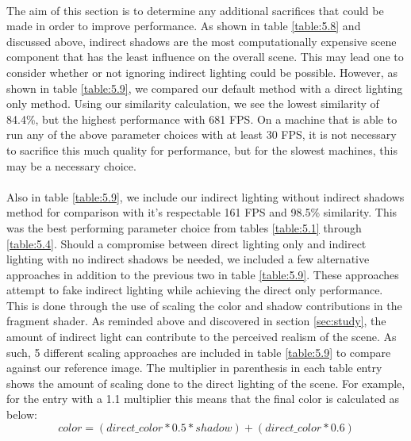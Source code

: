 \paragraph{}
The aim of this section is to determine any additional sacrifices that could be made in order to improve performance.  As shown in table \ref{table:5.8} and discussed above, indirect shadows are the most computationally expensive scene component that has the least influence on the overall scene.  This may lead one to consider whether or not ignoring indirect lighting could be possible.  However, as shown in table \ref{table:5.9}, we compared our default method with a direct lighting only method.  Using our similarity calculation, we see the lowest similarity of 84.4\%, but the highest performance with 681 FPS.  On a machine that is able to run any of the above parameter choices with at least 30 FPS, it is not necessary to sacrifice this much quality for performance, but for the slowest machines, this may be a necessary choice.

\paragraph{}
Also in table \ref{table:5.9}, we include our indirect lighting without indirect shadows method for comparison with it's respectable 161 FPS and 98.5\% similarity.  This was the best performing parameter choice from tables \ref{table:5.1} through \ref{table:5.4}.  Should a compromise between direct lighting only and indirect lighting with no indirect shadows be needed, we included a few alternative approaches in addition to the previous two in table \ref{table:5.9}.  These approaches attempt to fake indirect lighting while achieving the direct only performance.  This is done through the use of scaling the color and shadow contributions in the fragment shader.  As reminded above and discovered in section \ref{sec:study}, the amount of indirect light can contribute to the perceived realism of the scene.  As such, 5 different scaling approaches are included in table \ref{table:5.9} to compare against our reference image.  The multiplier in parenthesis in each table entry shows the amount of scaling done to the direct lighting of the scene.  For example, for the entry with a 1.1 multiplier this means that the final color is calculated as below:
\begin{equation}
color = (direct\_color*0.5*shadow)+(direct\_color*0.6)
\end{equation}

